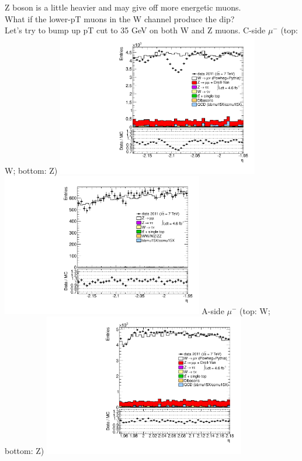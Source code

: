  {
Z boson is a little heavier and may give off more energetic muons. \\
What if the lower-pT muons in the W channel produce the dip? \\
Let's try to bump up pT cut to 35 GeV on both W and Z muons.
}
 {
\colb[T]
C-side $\mu^{-}$ (top: W; bottom: Z)
\centering
\includegraphics[width=0.66\textwidth]{dates/20130306/figures/etaphi/Wpt35_10_C_stack_l_eta_NEG} \\
\includegraphics[width=0.66\textwidth]{dates/20130306/figures/etaphi/Zpt35_10_C_stack_lN_eta_ALL.pdf}
A-side $\mu^{-}$ (top: W; bottom: Z)
\centering
\includegraphics[width=0.66\textwidth]{dates/20130306/figures/etaphi/Wpt35_10_A_stack_l_eta_NEG} \\
}
